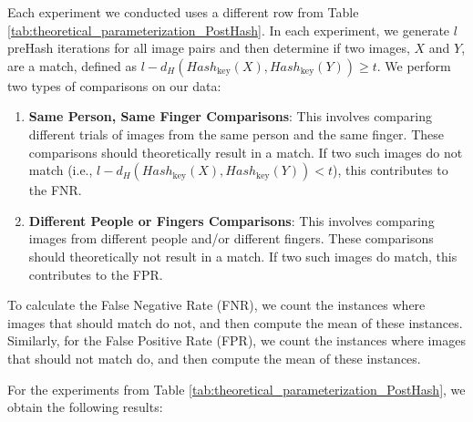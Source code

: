 Each experiment we conducted uses a different row from Table \ref{tab:theoretical_parameterization_PostHash}. In each experiment, we generate \( l \) preHash iterations for all image pairs and then determine if two images, \(X\) and \(Y\), are a match, defined as \( l - d_H(Hash_{\text{key}}(X), Hash_{\text{key}}(Y)) \geq t \). We perform two types of comparisons on our data:

\begin{enumerate}
    \item \textbf{Same Person, Same Finger Comparisons}: This involves comparing different trials of images from the same person and the same finger. These comparisons should theoretically result in a match. If two such images do not match (i.e., \( l - d_H(Hash_{\text{key}}(X), Hash_{\text{key}}(Y)) < t \)), this contributes to the FNR.
    \item \textbf{Different People or Fingers Comparisons}: This involves comparing images from different people and/or different fingers. These comparisons should theoretically not result in a match. If two such images do match, this contributes to the FPR.
\end{enumerate}

To calculate the False Negative Rate (FNR), we count the instances where images that should match do not, and then compute the mean of these instances. Similarly, for the False Positive Rate (FPR), we count the instances where images that should not match do, and then compute the mean of these instances.

For the experiments from Table \ref{tab:theoretical_parameterization_PostHash}, we obtain the following results:

